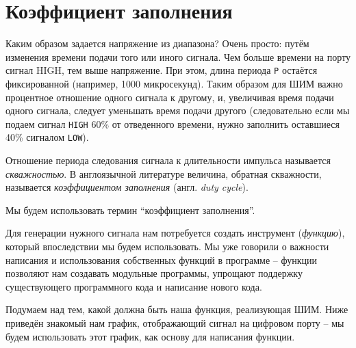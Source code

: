 \documentclass[../sparc.tex]{subfiles}
\begin{document}
\section{Коэффициент заполнения}

Каким образом задается напряжение из диапазона? Очень просто: путём изменения
времени подачи того или иного сигнала. Чем больше времени на порту сигнал HIGH,
тем выше напряжение. При этом, длина периода \texttt{P} остаётся фиксированной
(например, 1000 микросекунд). Таким образом для \gls{ШИМ} важно процентное
отношение одного сигнала к другому, и, увеличивая время подачи одного сигнала,
следует уменьшать время подачи другого (следовательно если мы подаем сигнал
\texttt{HIGH} 60\% от отведенного времени, нужно заполнить оставшиеся 40\%
сигналом \texttt{LOW}).

Отношение периода следования сигнала к длительности импульса называется
\emph{скважностью}. В англоязычной литературе величина, обратная скважности,
называется \emph{коэффициентом заполнения} (англ. \emph{duty cycle}).

Мы будем использовать термин ``коэффициент заполнения''.


Для генерации нужного сигнала нам потребуется создать инструмент
(\emph{функцию}), который впоследствии мы будем использовать. Мы уже говорили о
важности написания и использования собственных функций в программе -- функции
позволяют нам создавать модульные программы, упрощают поддержку существующего
программного кода и написание нового кода.

Подумаем над тем, какой должна быть наша функция, реализующая ШИМ. Ниже приведён
знакомый нам график, отображающий сигнал на цифровом порту -- мы будем
использовать этот график, как основу для написания функции.
\end{document}
